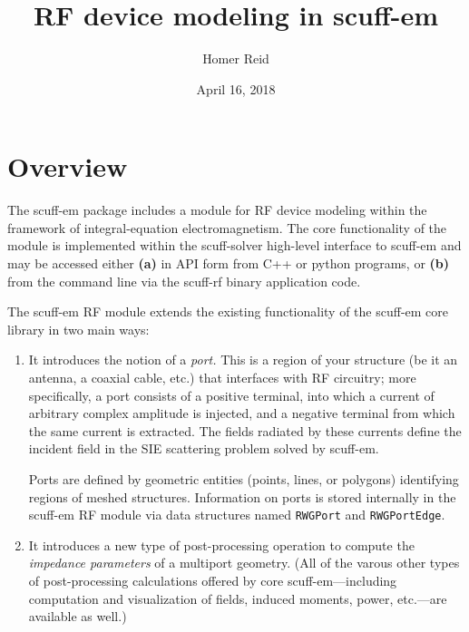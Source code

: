 \documentclass[letterpaper]{article}
\title {RF device modeling in {\sc scuff-em}}
\author {Homer Reid}
\date {April 16, 2018}
\begin{document}
\pagestyle{myheadings}
\maketitle

\tableofcontents

\section{Overview}

The {\sc scuff-em} package includes a module for RF device modeling
within the framework of integral-equation electromagnetism.
The core functionality of the module is implemented
within the {\sc scuff-solver} high-level interface to {\sc scuff-em}
and may be accessed either \textbf{(a)} in API form 
from C++ or python programs, or \textbf{(b)} from the command line
via the {\sc scuff-rf} binary application code.

The {\sc scuff-em} RF module extends the existing functionality of the
{\sc scuff-em} core library in two main ways:

\begin{enumerate}
  \item It introduces the notion of a \textit{port.} This is a region
        of your structure (be it an antenna, a coaxial cable, etc.)
        that interfaces with RF circuitry; more specifically, a port
        consists of a positive terminal, into which a current of arbitrary
        complex amplitude is injected,
        and a negative terminal from which the same current is extracted.
        The fields radiated by these currents define the incident field
        in the SIE scattering problem solved by {\sc scuff-em}.

        Ports are defined by geometric entities (points, lines, or
        polygons) identifying regions of meshed structures.
        Information on ports is stored internally in the {\sc scuff-em}
        RF module via data structures named \texttt{RWGPort} and 
        \texttt{RWGPortEdge}.
  \item It introduces a new type of post-processing operation
        to compute the \textit{impedance parameters} of a multiport geometry.
        (All of the varous other types of post-processing calculations offered by
        core {\sc scuff-em}---including computation and visualization of fields,
        induced moments, power, etc.---are available as well.)
\end{enumerate}
\end{document}
